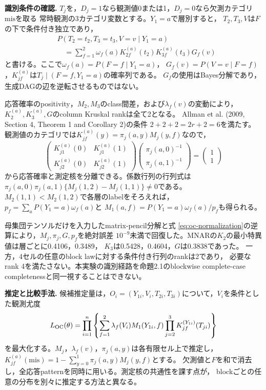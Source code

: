 \noindent\textbf{識別条件の確認.}
$T_j$を，$D_j=1$なら観測値0または1，$D_j=0$なら欠測カテゴリ$\mathrm{mis}$を取る
常時観測の3カテゴリ変数とする。$Y_1=a$で層別すると，
$T_2,T_3,V$は$F$の下で条件付き独立であり，
\begin{equation}
\begin{aligned}
&P(T_2=t_2,T_3=t_3,V=v\mid Y_1=a)\\
&\quad=\sum_{f=1}^2\omega_f(a)
K_{2f}^{(a)}(t_2)K_{3f}^{(a)}(t_3)G_f(v)
\end{aligned}
\label{eq:oc-tensor}
\end{equation}
と書ける。ここで$\omega_f(a)=P(F=f\mid Y_1=a)$，
$G_f(v)=P(V=v\mid F=f)$，$K_{jf}^{(a)}$は$T_j\mid(F=f,Y_1=a)$の確率列である。
$G_f$の使用はBayes分解であり，生成DAGの辺を逆転させるものではない。

応答確率のpositivity，$M_2,M_3$のclass間差，および$\lambda_f(v)$の変動により，
$K_2^{(a)},K_3^{(a)},G$のcolumn Kruskal rankは全て2となる。
Allman et al. (2009, Section 4, Theorem 1 and Corollary 2)の条件
$2+2+2=2r+2=6$を満たす。
観測値のカテゴリでは$K_{jf}^{(a)}(y)=\pi_j(a,y)M_j(y,f)$なので，
\begin{equation}
\begin{pmatrix}
K_{j1}^{(a)}(0)&K_{j1}^{(a)}(1)\\
K_{j2}^{(a)}(0)&K_{j2}^{(a)}(1)
\end{pmatrix}
\begin{pmatrix}\pi_j(a,0)^{-1}\\\pi_j(a,1)^{-1}\end{pmatrix}
=\begin{pmatrix}1\\1\end{pmatrix}
\label{eq:oc-normalization}
\end{equation}
から応答確率と測定核を分離できる。係数行列の行列式は
$\pi_j(a,0)\pi_j(a,1)\{M_j(1,2)-M_j(1,1)\}\ne0$である。
$M_2(1,1)<M_2(1,2)$で各層のlabelをそろえれば，
$p_f=\sum_aP(Y_1=a)\omega_f(a)$と
$M_1(a,f)=P(Y_1=a)\omega_f(a)/p_f$も得られる。

母集団テンソルだけを入力したmatrix-pencil分解と式
\eqref{eq:oc-normalization}の逆算により，$M_j,\pi_j,G,p_f$を絶対誤差
$10^{-9}$未満で回復した。MNARの$K_2$の最小特異値は層ごとに0.4106，0.3489，
$K_3$は0.5428，0.4604，$G$は0.3838であった。
一方，4セルの任意のblock lawに対する条件付き行列のrankは2であり，
必要なrank 4を満たさない。本実験の識別経路を命題2.1のblockwise
complete-case completenessと同一視することはできない。

\noindent\textbf{推定と比較手法.}
候補推定量は，$O_i=(Y_{1i},V_i,T_{2i},T_{3i})$について，$V_i$を条件とした観測尤度
\begin{equation}
L_{\rm OC}(\theta)=\prod_{i=1}^n
\left\{\sum_{f=1}^2\lambda_f(V_i)M_1(Y_{1i},f)
\prod_{j=2}^3K_{jf}^{(Y_{1i})}(T_{ji})\right\}
\label{eq:oc-likelihood}
\end{equation}
を最大化する。$M_j$，$\lambda_f(v)$，$\pi_j(a,y)$は各有限セル上で推定し，
$K_{jf}^{(a)}(\mathrm{mis})=1-\sum_{y=0}^1\pi_j(a,y)M_j(y,f)$とする。
欠測値と$F$を和で消去し，全応答patternを同時に用いる。測定核の共通性を課す点が，
blockごとの任意の分布を別々に推定する方法と異なる。

